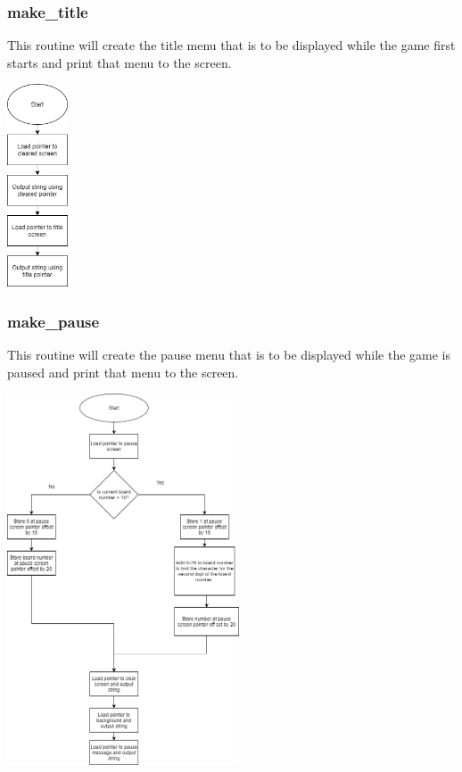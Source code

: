 \documentclass{article}
\begin{document}
    \subsubsection{make\_title}
        This routine will create the title menu that is to be displayed while the game first starts and 
        print that menu to the screen.
        \begin{center}
            {\includegraphics[height=6cm]{make_title.png}\centering} 
        \end{center}
        \newpage

    \subsubsection{make\_pause}
        This routine will create the pause menu that is to be displayed while the game is paused and 
        print that menu to the screen.
        \begin{center}
            {\includegraphics[height=11cm]{make_pause.png}\centering} 
        \end{center}
\end{document}
